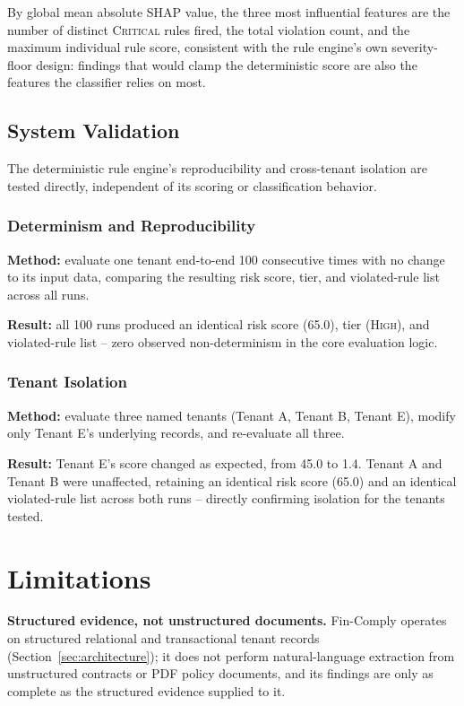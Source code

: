 \documentclass[11pt,a4paper]{article}
\newcommand{\system}{Fin-Comply}
\begin{document}
By global mean absolute SHAP value, the three most influential features are the number of distinct \textsc{Critical} rules fired, the total violation count, and the maximum individual rule score, consistent with the rule engine's own severity-floor design: findings that would clamp the deterministic score are also the features the classifier relies on most.

\subsection{System Validation}
\label{sec:systemval}
The deterministic rule engine's reproducibility and cross-tenant isolation are tested directly, independent of its scoring or classification behavior.

\subsubsection{Determinism and Reproducibility}
\label{sec:determinism}
\textbf{Method:} evaluate one tenant end-to-end 100 consecutive times with no change to its input data, comparing the resulting risk score, tier, and violated-rule list across all runs.

\textbf{Result:} all 100 runs produced an identical risk score (65.0), tier (\textsc{High}), and violated-rule list -- zero observed non-determinism in the core evaluation logic.

\subsubsection{Tenant Isolation}
\label{sec:isolation}
\textbf{Method:} evaluate three named tenants (Tenant A, Tenant B, Tenant E), modify only Tenant E's underlying records, and re-evaluate all three.

\textbf{Result:} Tenant E's score changed as expected, from 45.0 to 1.4. Tenant A and Tenant B were unaffected, retaining an identical risk score (65.0) and an identical violated-rule list across both runs -- directly confirming isolation for the tenants tested.

\section{Limitations}
\label{sec:limitations}
\textbf{Structured evidence, not unstructured documents.} \system{} operates on structured relational and transactional tenant records (Section~\ref{sec:architecture}); it does not perform natural-language extraction from unstructured contracts or PDF policy documents, and its findings are only as complete as the structured evidence supplied to it.
\end{document}
